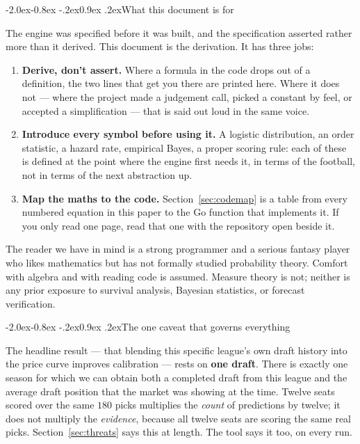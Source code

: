 \documentclass[10pt,a4paper]{article}
\makeatletter
\theoremstyle{plain}
\theoremstyle{definition}
\theoremstyle{remark}
\renewcommand\subsection{\@startsection{subsection}{2}{\z@}%
  {-2.0ex\@plus -0.8ex \@minus -.2ex}{0.9ex \@plus .2ex}{\normalfont\large\bfseries}}
\makeatother
\begin{document}
\subsection{What this document is for}

The engine was specified before it was built, and the specification asserted rather
more than it derived. This document is the derivation. It has three jobs:

\begin{enumerate}
\item \textbf{Derive, don't assert.} Where a formula in the code drops out of a
definition, the two lines that get you there are printed here. Where it does not ---
where the project made a judgement call, picked a constant by feel, or accepted a
simplification --- that is said out loud in the same voice.

\item \textbf{Introduce every symbol before using it.} A logistic distribution, an
order statistic, a hazard rate, empirical Bayes, a proper scoring rule: each of these
is defined at the point where the engine first needs it, in terms of the football, not
in terms of the next abstraction up.

\item \textbf{Map the maths to the code.} Section~\ref{sec:codemap} is a table from
every numbered equation in this paper to the Go function that implements it. If you
only read one page, read that one with the repository open beside it.
\end{enumerate}

The reader we have in mind is a strong programmer and a serious fantasy player who
likes mathematics but has not formally studied probability theory. Comfort with
algebra and with reading code is assumed. Measure theory is not; neither is any prior
exposure to survival analysis, Bayesian statistics, or forecast verification.

\subsection{The one caveat that governs everything}

The headline result --- that blending this specific league's own draft history into
the price curve improves calibration --- rests on \textbf{one draft}. There is exactly
one season for which we can obtain both a completed draft from this league and the
average draft position that the market was showing at the time. Twelve seats scored
over the same $180$ picks multiplies the \emph{count} of predictions by twelve; it does
not multiply the \emph{evidence}, because all twelve seats are scoring the same real
picks. Section~\ref{sec:threats} says this at length. The tool says it too, on every
run.
\end{document}
